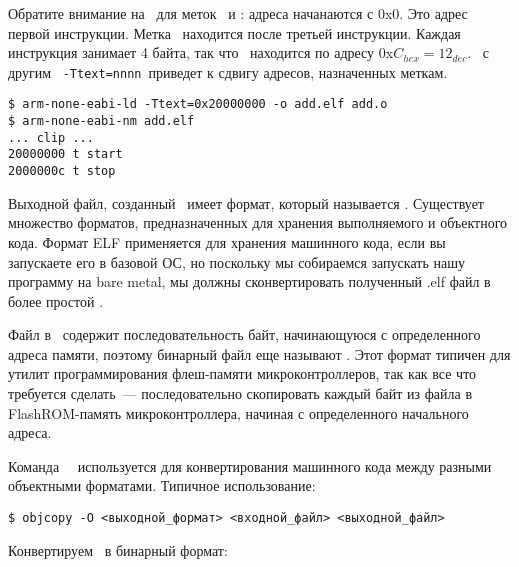 Обратите внимание на \ для меток
\ и : адреса начанаются с 0x0. Это адрес первой инструкции.
Метка \ находится после третьей инструкции. Каждая инструкция занимает
4 байта, так что \ находится по адресу 0x$C_{hex}=12_{dec}$.
\ с другим \ \verb|-Ttext=nnnn|\ приведет к сдвигу адресов, назначенных меткам.

\begin{verbatim}
$ arm-none-eabi-ld -Ttext=0x20000000 -o add.elf add.o
$ arm-none-eabi-nm add.elf
... clip ...
20000000 t start
2000000c t stop
\end{verbatim}

\bigskip
Выходной файл, созданный \ имеет формат, который называется
. Существует множество форматов, предназначенных для хранения
выполняемого и объектного кода. Формат ELF применяется для хранения
машинного кода, если вы запускаете его в базовой ОС, но поскольку мы собираемся запускать нашу
программу на bare metal, мы должны сконвертировать полученный
.elf файл в более простой .

Файл в \ содержит последовательность байт, начинающуюся с
определенного адреса памяти, поэтому бинарный файл еще 
называют . Этот
формат типичен для утилит программирования флеш-памяти микроконтроллеров, так
как все что требуется сделать\ --- последовательно скопировать каждый байт из
файла в FlashROM-память микроконтроллера, начиная с определенного начального
адреса.

Команда \gnut\ \ используется для конвертирования машинного кода
между разными объектными форматами. Типичное использование:

\begin{verbatim}
$ objcopy -O <выходной_формат> <входной_файл> <выходной_файл>
\end{verbatim}

Конвертируем \ в бинарный формат:

